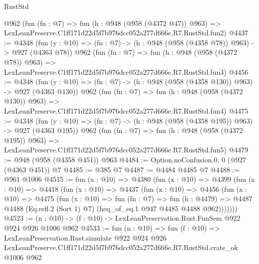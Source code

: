 \begin{lexlean}{RustStd}
\begin{coremodule}
    @962
    (fun (fn : @7) =>
    fun (h : @948 (@958 (@4372 @47)) @963) =>
    LexLeanPreserve.C1ff171d22d5f7b976dcc052a277d666e.R7.RustStd.fun2)
@4437 := @4348
    (fun (y : @10) => (fn : @7) -> (h : @948 (@958 (@4358 @78)) @963) -> @927 (@4363 @78))
    @962
    (fun (fn : @7) =>
    fun (h : @948 (@958 (@4372 @78)) @963) =>
    LexLeanPreserve.C1ff171d22d5f7b976dcc052a277d666e.R7.RustStd.fun3)
@4456 := @4348
    (fun (y : @10) => (fn : @7) -> (h : @948 (@958 (@4358 @130)) @963) -> @927 (@4363 @130))
    @962
    (fun (fn : @7) =>
    fun (h : @948 (@958 (@4372 @130)) @963) =>
    LexLeanPreserve.C1ff171d22d5f7b976dcc052a277d666e.R7.RustStd.fun4)
@4475 := @4348
    (fun (y : @10) => (fn : @7) -> (h : @948 (@958 (@4358 @195)) @963) -> @927 (@4363 @195))
    @962
    (fun (fn : @7) =>
    fun (h : @948 (@958 (@4372 @195)) @963) =>
    LexLeanPreserve.C1ff171d22d5f7b976dcc052a277d666e.R7.RustStd.fun5)
@4479 := @948 (@958 (@4358 @451)) @963
@4484 := Option.noConfusion.{0, 0} (@927 (@4363 @451)) @7
@4485 := @385 @7
@4487 := @4484 @4485 @7
@4488 := @961 @1006
@4515 := fun (x : @10) =>
  @4380
    (fun (x : @10) =>
    @4399
      (fun (x : @10) =>
      @4418
        (fun (x : @10) =>
        @4437
          (fun (x : @10) =>
          @4456
            (fun (x : @10) =>
            @4475
              (fun (x : @10) =>
              fun (fn : @7) =>
              fun (h : @4479) =>
              @4487 @4488 (Eq.refl.{2} (Sort 1) @7) (heq_of_eq.{1} @947 @4485 @4488 @962)))))))
@4523 := (n : @10) -> (f : @10) -> LexLeanPreservation.Rust.FunSem @922 @924 @926 @1006 @962
@4533 := fun (n : @10) =>
  fun (f : @10) =>
  LexLeanPreservation.Rust.simulate
    @922
    @924
    @926
    LexLeanPreserve.C1ff171d22d5f7b976dcc052a277d666e.R7.RustStd.crate_ok
    @1006
    @962
\end{coremodule}
\end{lexlean}

